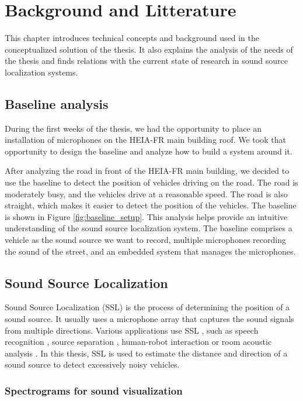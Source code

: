 \chapter{Background and Litterature}
\label{ch:background}

This chapter introduces technical concepts and background used in the conceptualized solution of the thesis. It also explains the analysis of the needs of the thesis and finds relations with the current state of research in sound source localization systems.

\section{Baseline analysis}

During the first weeks of the thesis, we had the opportunity to place an installation of microphones on the HEIA-FR main building roof. We took that opportunity to design the baseline and analyze how to build a system around it.

After analyzing the road in front of the HEIA-FR main building, we decided to use the baseline to detect the position of vehicles driving on the road. The road is moderately busy, and the vehicles drive at a reasonable speed. The road is also straight, which makes it easier to detect the position of the vehicles. The baseline is shown in Figure \ref{fig:baseline_setup}. This analysis helps provide an intuitive understanding of the sound source localization system. The baseline comprises a vehicle as the sound source we want to record, multiple microphones recording the sound of the street, and an embedded system that manages the microphones.

\section{Sound Source Localization}

Sound Source Localization (SSL) is the process of determining the position of a sound source. It usually uses a microphone array that captures the sound signals from multiple directions. Various applications use SSL \cite{Grumiaux_2022}, such as speech recognition \cite{7952261}, source separation \cite{8903121}, human-robot interaction \cite{Li_2016} or room acoustic analysis \cite{amengual}. In this thesis, SSL is used to estimate the distance and direction of a sound source to detect excessively noisy vehicles.

\subsection{Spectrograms for sound visualization}
\label{subsec:spectrograms}

